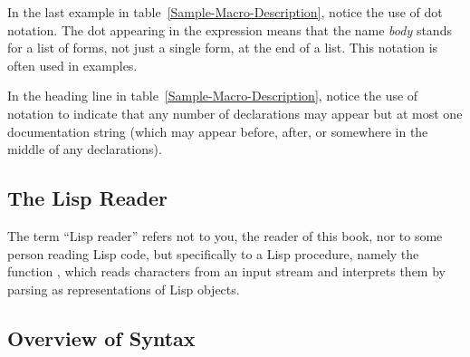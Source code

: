 In the last example in table~\ref{Sample-Macro-Description}, notice the
use of dot notation.  The dot appearing in the expression
 means that the name {\it body} stands
for a list of forms, not just a single form, at the end of a list.  This
notation is often used in examples.

\begin{newer}
In the heading line in table~\ref{Sample-Macro-Description}, notice the
use of \Mchoice{~} notation to indicate that any number of declarations
may appear but at most one documentation string (which may appear before,
after, or somewhere in the middle of any declarations).
\end{newer}


\subsection{The Lisp Reader}

The term ``Lisp reader'' refers not to you, the reader of this book,
nor to some person reading Lisp code, but specifically
to a Lisp procedure, namely the function ,
which reads characters from an input stream and interprets them by parsing
as representations of Lisp objects.

\subsection{Overview of Syntax}


